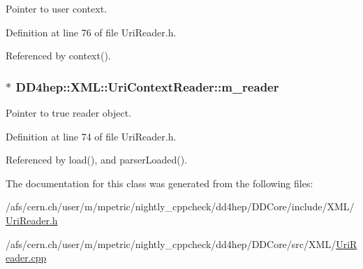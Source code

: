 Pointer to user context. 

Definition at line 76 of file UriReader.h.

Referenced by context().\hypertarget{class_d_d4hep_1_1_x_m_l_1_1_uri_context_reader_a55aeba72e0e3b7ca7699c1b9fa439da8}{
\subsubsection[{m\_\-reader}]{$\ast$ {\bf DD4hep::XML::UriContextReader::m\_\-reader}}}
\label{class_d_d4hep_1_1_x_m_l_1_1_uri_context_reader_a55aeba72e0e3b7ca7699c1b9fa439da8}


Pointer to true reader object. 

Definition at line 74 of file UriReader.h.

Referenced by load(), and parserLoaded().

The documentation for this class was generated from the following files:\begin{DoxyCompactItemize}
\item 
/afs/cern.ch/user/m/mpetric/nightly\_\-cppcheck/dd4hep/DDCore/include/XML/\hyperlink{_uri_reader_8h}{UriReader.h}\item 
/afs/cern.ch/user/m/mpetric/nightly\_\-cppcheck/dd4hep/DDCore/src/XML/\hyperlink{_uri_reader_8cpp}{UriReader.cpp}\end{DoxyCompactItemize}

